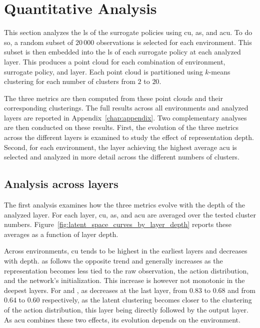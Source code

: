 \section{Quantitative Analysis}
\label{sec:experiments_latent_space_analysis}

This section analyzes the \gls{ls} of the surrogate policies using \gls{cu}, \gls{as}, and \gls{acu}.
To do so, a random subset of $20\,000$ observations is selected for each environment.
This subset is then embedded into the \gls{ls} of each surrogate policy at each analyzed layer.
This produces a point cloud for each combination of environment, surrogate policy, and layer.
Each point cloud is partitioned using $k$-means clustering \cite{macqueen1967multivariate} for each number of clusters from $2$ to $20$.

The three metrics are then computed from these point clouds and their corresponding clusterings.
The full results across all environments and analyzed layers are reported in Appendix~\ref{chap:appendix}.
Two complementary analyses are then conducted on these results.
First, the evolution of the three metrics across the different layers is examined to study the effect of representation depth.
Second, for each environment, the layer achieving the highest average \gls{acu} is selected and analyzed in more detail across the different numbers of clusters.

\subsection{Analysis across layers}

The first analysis examines how the three metrics evolve with the depth of the analyzed layer.
For each layer, \gls{cu}, \gls{as}, and \gls{acu} are averaged over the tested cluster numbers.
Figure~\ref{fig:latent_space_curves_by_layer_depth} reports these averages as a function of layer depth.

Across environments, \gls{cu} tends to be highest in the earliest layers and decreases with depth.
\gls{as} follows the opposite trend and generally increases as the representation becomes less tied to the raw observation, the action distribution, and the network's initialization.
This increase is however not monotonic in the deepest layers.
For \MarioBrosName and \MsPacManName, \gls{as} decreases at the last layer, from $0.83$ to $0.68$ and from $0.64$ to $0.60$ respectively, as the latent clustering becomes closer to the clustering of the action distribution, this layer being directly followed by the output layer.
As \gls{acu} combines these two effects, its evolution depends on the environment.

